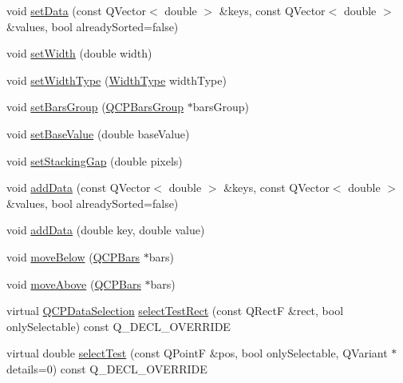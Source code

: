\begin{DoxyCompactItemize}
\item 
void \mbox{\hyperlink{class_q_c_p_bars_a2a88cd5b16ec7b71e5a590f95b50c5ce}{set\+Data}} (const Q\+Vector$<$ double $>$ \&keys, const Q\+Vector$<$ double $>$ \&values, bool already\+Sorted=false)
\item 
void \mbox{\hyperlink{class_q_c_p_bars_afec6116579d44d5b706e0fa5e5332507}{set\+Width}} (double width)
\item 
void \mbox{\hyperlink{class_q_c_p_bars_adcaa3b41281bb2c0f7949b341592fcc0}{set\+Width\+Type}} (\mbox{\hyperlink{class_q_c_p_bars_a65dbbf1ab41cbe993d71521096ed4649}{Width\+Type}} width\+Type)
\item 
void \mbox{\hyperlink{class_q_c_p_bars_aedd1709061f0b307c47ddb45e172ef9a}{set\+Bars\+Group}} (\mbox{\hyperlink{class_q_c_p_bars_group}{Q\+C\+P\+Bars\+Group}} $\ast$bars\+Group)
\item 
void \mbox{\hyperlink{class_q_c_p_bars_a574ec7eb7537566df1a28ff085d75623}{set\+Base\+Value}} (double base\+Value)
\item 
void \mbox{\hyperlink{class_q_c_p_bars_aeacf7561afb1c70284b22822b57c7bb5}{set\+Stacking\+Gap}} (double pixels)
\item 
void \mbox{\hyperlink{class_q_c_p_bars_a323d6970d6d6e3166d89916a7f60f733}{add\+Data}} (const Q\+Vector$<$ double $>$ \&keys, const Q\+Vector$<$ double $>$ \&values, bool already\+Sorted=false)
\item 
void \mbox{\hyperlink{class_q_c_p_bars_a684dd105403a5497fda42f2094fecbb7}{add\+Data}} (double key, double value)
\item 
void \mbox{\hyperlink{class_q_c_p_bars_a69fc371346980f19177c3d1ecdad78ee}{move\+Below}} (\mbox{\hyperlink{class_q_c_p_bars}{Q\+C\+P\+Bars}} $\ast$bars)
\item 
void \mbox{\hyperlink{class_q_c_p_bars_ac22e00a6a41509538c21b04f0a57318c}{move\+Above}} (\mbox{\hyperlink{class_q_c_p_bars}{Q\+C\+P\+Bars}} $\ast$bars)
\item 
virtual \mbox{\hyperlink{class_q_c_p_data_selection}{Q\+C\+P\+Data\+Selection}} \mbox{\hyperlink{class_q_c_p_bars_ab03bb6125c3e983b89d694f75ce6b3d5}{select\+Test\+Rect}} (const Q\+RectF \&rect, bool only\+Selectable) const Q\+\_\+\+D\+E\+C\+L\+\_\+\+O\+V\+E\+R\+R\+I\+DE
\item 
virtual double \mbox{\hyperlink{class_q_c_p_bars_a121f899c27af3186fe93dcd0eb98f49b}{select\+Test}} (const Q\+PointF \&pos, bool only\+Selectable, Q\+Variant $\ast$details=0) const Q\+\_\+\+D\+E\+C\+L\+\_\+\+O\+V\+E\+R\+R\+I\+DE
\item 

\end{DoxyCompactItemize}
